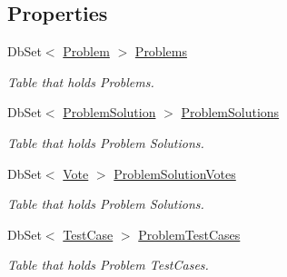 \subsection*{Properties}
\begin{DoxyCompactItemize}
\item 
Db\+Set$<$ \mbox{\hyperlink{class_code_a_friend_1_1_data_model_1_1_problem}{Problem}} $>$ \mbox{\hyperlink{class_code_a_friend_1_1_repository_1_1_code_a_friend_context_a29c223337459ca32c2831de84993b73d}{Problems}}
\begin{DoxyCompactList}\small\item\em Table that holds Problems.\end{DoxyCompactList}\item 
Db\+Set$<$ \mbox{\hyperlink{class_code_a_friend_1_1_data_model_1_1_problem_solution}{Problem\+Solution}} $>$ \mbox{\hyperlink{class_code_a_friend_1_1_repository_1_1_code_a_friend_context_a58b681af6a297c85487e2454ef51ac01}{Problem\+Solutions}}
\begin{DoxyCompactList}\small\item\em Table that holds Problem Solutions.\end{DoxyCompactList}\item 
Db\+Set$<$ \mbox{\hyperlink{class_code_a_friend_1_1_data_model_1_1_vote}{Vote}} $>$ \mbox{\hyperlink{class_code_a_friend_1_1_repository_1_1_code_a_friend_context_a51510b18f90a485162292c9674df33a3}{Problem\+Solution\+Votes}}
\begin{DoxyCompactList}\small\item\em Table that holds Problem Solutions.\end{DoxyCompactList}\item 
Db\+Set$<$ \mbox{\hyperlink{class_code_a_friend_1_1_data_model_1_1_test_case}{Test\+Case}} $>$ \mbox{\hyperlink{class_code_a_friend_1_1_repository_1_1_code_a_friend_context_a67843b6a9a6180107c1721b671d029a4}{Problem\+Test\+Cases}}
\begin{DoxyCompactList}\small\item\em Table that holds Problem Test\+Cases.\end{DoxyCompactList}\item 

\end{DoxyCompactItemize}
